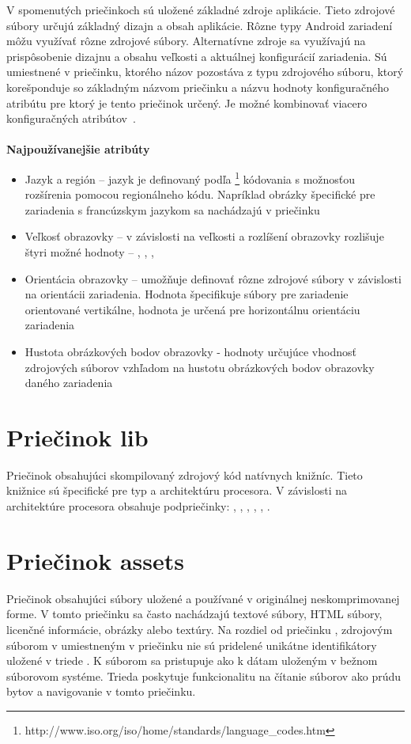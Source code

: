 \noindent V spomenutých priečinkoch sú uložené základné zdroje aplikácie. Tieto zdrojové súbory určujú základný dizajn a obsah aplikácie. Rôzne typy Android zariadení môžu využívať rôzne zdrojové súbory. Alternatívne zdroje sa využívajú na prispôsobenie dizajnu a obsahu veľkosti a aktuálnej konfigurácií zariadenia. Sú umiestnené v priečinku, ktorého názov pozostáva z typu zdrojového súboru, ktorý korešponduje so základným názvom priečinku a názvu hodnoty konfiguračného atribútu pre ktorý je tento priečinok určený. Je možné kombinovať viacero konfiguračných atribútov~\cite{providingAltRes}.\\\\
\textbf{Najpoužívanejšie atribúty}
\begin{itemize}
\item Jazyk a región – jazyk je definovaný podľa \footnote{http://www.iso.org/iso/home/standards/language\_codes.htm} kódovania s možnosťou rozšírenia pomocou  regionálneho kódu. Napríklad obrázky špecifické pre zariadenia s francúzskym jazykom sa nachádzajú v priečinku 
\item Veľkosť obrazovky –  v závislosti na veľkosti a rozlíšení obrazovky rozlišuje štyri možné hodnoty -- , , , 
\item Orientácia obrazovky – umožňuje definovať rôzne zdrojové súbory v závislosti na orientácii zariadenia. Hodnota  špecifikuje súbory pre zariadenie orientované vertikálne, hodnota  je určená pre horizontálnu orientáciu zariadenia	
\item Hustota obrázkových bodov obrazovky -  hodnoty určujúce vhodnosť zdrojových súborov vzhľadom na hustotu obrázkových bodov obrazovky daného zariadenia
\end{itemize}


\section{Priečinok lib}
\label{lib}
Priečinok obsahujúci skompilovaný zdrojový kód natívnych knižníc. Tieto knižnice sú špecifické pre typ a architektúru procesora. V závislosti na architektúre procesora obsahuje podpriečinky: , , , , , .

\section{Priečinok assets}
\label{assets}
Priečinok obsahujúci súbory uložené a používané v originálnej neskomprimovanej forme. V tomto priečinku sa často nachádzajú textové súbory, HTML súbory, licenčné informácie, obrázky alebo textúry. Na rozdiel od priečinku , zdrojovým súborom v umiestneným v priečinku  nie sú pridelené unikátne identifikátory uložené v triede . K súborom sa pristupuje ako k dátam uloženým v bežnom súborovom systéme. Trieda  poskytuje funkcionalitu na čítanie súborov ako prúdu bytov a  navigovanie v tomto priečinku.

